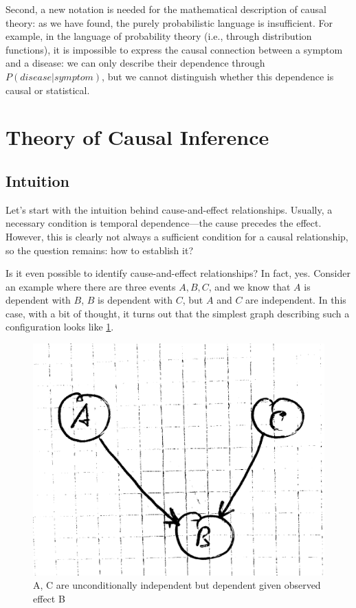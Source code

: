 \documentclass[fleqn]{article}
\numberwithin{equation}{section}
\numberwithin{theorem}{section}
\numberwithin{figure}{section}
\numberwithin{lemma}{section}
\numberwithin{corollary}{section}
\begin{document}
Second, a new notation is needed for the mathematical description of causal theory: as we have found, the purely probabilistic language is insufficient. For example, in the language of probability theory (i.e., through distribution functions), it is impossible to express the causal connection between a symptom and a disease: we can only describe their dependence through $P(disease | symptom)$, but we cannot distinguish whether this dependence is causal or statistical.

\section{Theory of Causal Inference}

\subsection*{Intuition}
Let's start with the intuition behind cause-and-effect relationships. Usually, a necessary condition is temporal dependence—the cause precedes the effect. However, this is clearly not always a sufficient condition for a causal relationship, so the question remains: how to establish it?

Is it even possible to identify cause-and-effect relationships? In fact, yes. Consider an example where there are three events $A, B, C$, and we know that $A$ is dependent with $B$, $B$ is dependent with $C$, but $A$ and $C$ are independent. In this case, with a bit of thought, it turns out that the simplest graph describing such a configuration looks like \ref{fig:abc}.

\begin{figure}[h]
	\begin{center}
		\includegraphics[scale=0.1]{imgs/img1.png}
	\end{center}
	\caption{A, C are unconditionally independent but dependent given observed effect B}
	\label{fig:abc}
\end{figure}
\end{document}
